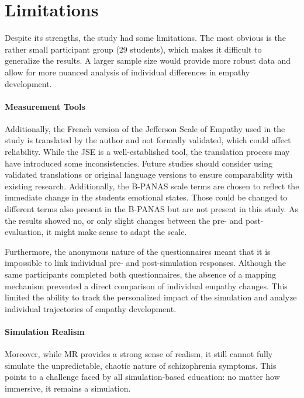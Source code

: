 \section{Limitations}

Despite its strengths, the study had some limitations. The most obvious is the rather small participant group (29 students), which makes it difficult to generalize the results. A larger sample size would provide more robust data and allow for more nuanced analysis of individual differences in empathy development.

\paragraph{Measurement Tools} Additionally, the French version of the Jefferson Scale of Empathy used in the study is translated by the author and not formally validated, which could affect reliability. While the JSE is a well-established tool, the translation process may have introduced some inconsistencies. Future studies should consider using validated translations or original language versions to ensure comparability with existing research. Additionally, the B-PANAS scale terms are chosen to reflect the immediate change in the students emotional states. Those could be changed to different terms also present in the B-PANAS but are not present in this study. As the results showed no, or only slight changes between the pre- and post-evaluation, it might make sense to adapt the scale. 

\vspace{1em}

Furthermore, the anonymous nature of the questionnaires meant that it is impossible to link individual pre- and post-simulation responses. Although the same participants completed both questionnaires, the absence of a mapping mechanism prevented a direct comparison of individual empathy changes. This limited the ability to track the personalized impact of the simulation and analyze individual trajectories of empathy development.


\paragraph{Simulation Realism} Moreover, while MR provides a strong sense of realism, it still cannot fully simulate the unpredictable, chaotic nature of schizophrenia symptoms. This points to a challenge faced by all simulation-based education: no matter how immersive, it remains a simulation. 

